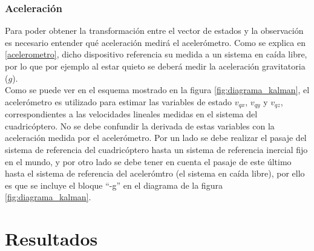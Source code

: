 \documentclass[main]{subfiles}
\begin{document}
\subsubsection{Aceleración}

Para poder obtener la transformación entre el vector de estados y la observación es necesario entender qué aceleración medirá el acelerómetro. Como se explica en \ref{acelerometro}, dicho dispositivo referencia su medida a un sistema en caída libre, por lo que por ejemplo al estar quieto se deberá medir la aceleración gravitatoria ($g$).\\
Como se puede ver en el esquema mostrado en la figura \ref{fig:diagrama_kalman}, el acelerómetro es utilizado para estimar las variables de estado $v_{qx}$, $v_{qy}$ y $v_{qz}$, correspondientes a las velocidades lineales medidas en el sistema del cuadricóptero. No se debe confundir la derivada de estas variables con la aceleración medida por el acelerómetro. Por un lado se debe realizar el pasaje del sistema de referencia del cuadricóptero hasta un sistema de referencia inercial fijo en el mundo, y por otro lado se debe tener en cuenta el pasaje de este último hasta el sistema de referencia del acelerómtro (el sistema en caída libre), por ello es que se incluye el bloque ``-g'' en el diagrama de la figura \ref{fig:diagrama_kalman}.



\section{Resultados}
\end{document}
